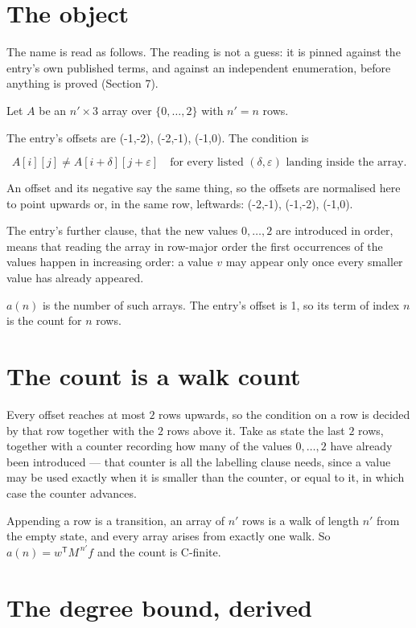 \documentclass[11pt]{article}
\theoremstyle{definition}
\begin{document}
\section{The object}

The name is read as follows. The reading is not a guess: it is pinned against the entry's own published terms, and against an independent enumeration, before anything is proved (Section 7).

Let $A$ be an $n' \times 3$ array over $\{0,\dots,2\}$ with $n' = n$ rows.

The entry's offsets are (-1,-2), (-2,-1), (-1,0). The condition is

\[A[i][j] \ne A[i{+}\delta][j{+}\varepsilon]\quad\text{for every listed }(\delta,\varepsilon)\text{ landing inside the array.}\]

An offset and its negative say the same thing, so the offsets are normalised here to point upwards or, in the same row, leftwards: (-2,-1), (-1,-2), (-1,0).

The entry's further clause, that the new values $0,\dots,2$ are introduced in order, means that reading the array in row-major order the first occurrences of the values happen in increasing order: a value $v$ may appear only once every smaller value has already appeared.

$a(n)$ is the number of such arrays. The entry's offset is 1, so its term of index $n$ is the count for $n$ rows.

\section{The count is a walk count}

Every offset reaches at most $2$ rows upwards, so the condition on a row is decided by that row together with the $2$ rows above it. Take as state the last $2$ rows, together with a counter recording how many of the values $0,\dots,2$ have already been introduced --- that counter is all the labelling clause needs, since a value may be used exactly when it is smaller than the counter, or equal to it, in which case the counter advances.

Appending a row is a transition, an array of $n'$ rows is a walk of length $n'$ from the empty state, and every array arises from exactly one walk. So $a(n) = w^{\mathsf T}M^{\,n'}f$ and the count is C-finite.

\section{The degree bound, derived}
\end{document}
